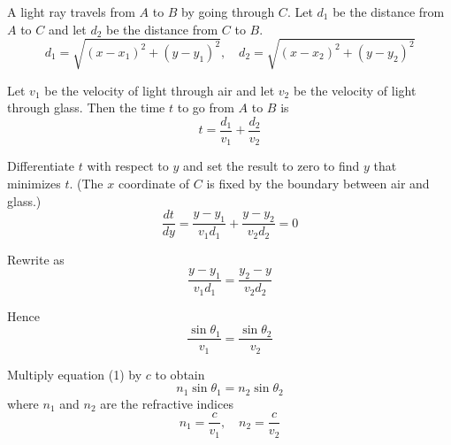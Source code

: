 


\begin{center}
\end{center}

A light ray travels from $A$ to $B$ by going through $C$.
Let $d_1$ be the distance from $A$ to $C$ and let $d_2$ be the distance from $C$ to $B$.
\begin{equation*}
d_1=\sqrt{(x-x_1)^2+(y-y_1)^2},
\quad
d_2=\sqrt{(x-x_2)^2+(y-y_2)^2}
\end{equation*}

Let $v_1$ be the velocity of light through air and let $v_2$ be the velocity of light through glass.
Then the time $t$ to go from $A$ to $B$ is
\begin{equation*}
t=\frac{d_1}{v_1}+\frac{d_2}{v_2}
\end{equation*}

Differentiate $t$ with respect to $y$ and set the result to zero to find $y$ that minimizes $t$.
(The $x$ coordinate of $C$ is fixed by the boundary between air and glass.)
\begin{equation*}
\frac{dt}{dy}=\frac{y-y_1}{v_1d_1}+\frac{y-y_2}{v_2d_2}=0
\end{equation*}

Rewrite as
\begin{equation*}
\frac{y-y_1}{v_1d_1}=\frac{y_2-y}{v_2d_2}
\end{equation*}

Hence
\begin{equation*}
\frac{\sin\theta_1}{v_1}=\frac{\sin\theta_2}{v_2}
\tag{1}
\end{equation*}

Multiply equation (1) by $c$ to obtain
\begin{equation*}
n_1\sin\theta_1=n_2\sin\theta_2
\end{equation*}
where $n_1$ and $n_2$ are the refractive indices
\begin{equation*}
n_1=\frac{c}{v_1},
\quad n_2=\frac{c}{v_2}
\end{equation*}


